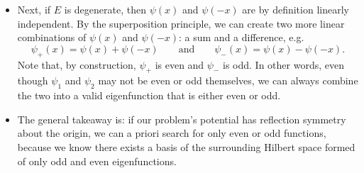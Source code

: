 \documentclass[11pt, a4paper]{article}
\newcommand{\eqtext}[1]{\qquad \text{#1} \qquad}
\begin{document}
\begin{itemize}
	\item Next, if $ E $ is degenerate, then $ \psi(x) $ and $ \psi(-x) $ are by definition linearly independent. By the superposition principle, we can create two more linear combinations of $ \psi(x) $ and $ \psi(-x) $: a sum and a difference, e.g.
	\begin{equation*}
		\psi_{+}(x) = \psi(x) + \psi(-x) \eqtext{and} \psi_{-}(x) = \psi(x) - \psi(-x).
	\end{equation*}
	Note that, by construction, $ \psi_{+} $ is even and $ \psi_{-} $ is odd. In other words, even though $ \psi_{1} $ and $ \psi_{2} $ may not be even or odd themselves, we can always combine the two into a valid eigenfunction that is either even or odd.
	
	\item The general takeaway is: if our problem's potential has reflection symmetry about the origin, we can a priori search for only even or odd functions, because we know there exists a basis of the surrounding Hilbert space formed of only odd and even eigenfunctions.
\end{itemize}
\end{document}
